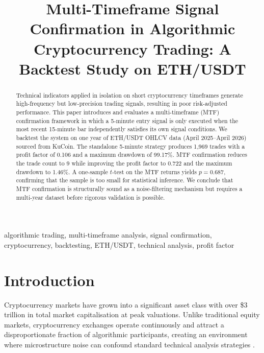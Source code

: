 \documentclass[conference]{IEEEtran}
\title{Multi-Timeframe Signal Confirmation in Algorithmic
Cryptocurrency Trading: A Backtest Study on ETH/USDT}
\author{%
  \IEEEauthorblockN{Raghav Goswami}
  \IEEEauthorblockA{%
    Independent Research\\
    \textit{goswamiraghav99@gmail.com}%
  }
}
\begin{document}
\maketitle

\begin{abstract}
Technical indicators applied in isolation on short
cryptocurrency timeframes generate high-frequency but
low-precision trading signals, resulting in poor
risk-adjusted performance. This paper introduces and
evaluates a multi-timeframe (MTF) confirmation framework
in which a 5-minute entry signal is only executed when the
most recent 15-minute bar independently satisfies its own
signal conditions. We backtest the system on one year of
ETH/USDT OHLCV data (April 2025--April 2026) sourced from
KuCoin. The standalone 5-minute strategy produces 1,969
trades with a profit factor of 0.106 and a maximum
drawdown of 99.17\%. MTF confirmation reduces the trade
count to 9 while improving the profit factor to 0.722 and
the maximum drawdown to 1.46\%. A one-sample $t$-test on
the MTF returns yields $p = 0.687$, confirming that the
sample is too small for statistical inference. We conclude
that MTF confirmation is structurally sound as a noise-filtering
mechanism but requires a multi-year dataset before rigorous
validation is possible.
\end{abstract}

\begin{IEEEkeywords}
algorithmic trading, multi-timeframe analysis, signal
confirmation, cryptocurrency, backtesting, ETH/USDT,
technical analysis, profit factor
\end{IEEEkeywords}


\section{Introduction}
\label{sec:intro}

Cryptocurrency markets have grown into a significant asset
class with over \$3 trillion in total market capitalisation
at peak valuations. Unlike traditional equity markets,
cryptocurrency exchanges operate continuously and attract a
disproportionate fraction of algorithmic participants,
creating an environment where microstructure noise can
confound standard technical analysis strategies
\cite{baur2018bitcoin, nadarajah2017inefficiency}.
\end{document}
